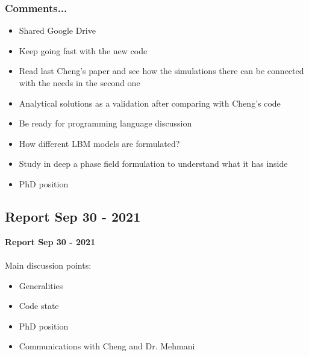 \documentclass{beamer}
\begin{document}
	\begin{frame}
		\frametitle{Comments...}
		\begin{itemize}
			\item Shared Google Drive
			\item Keep going fast with the new code
			\item Read last Cheng's paper and see how the simulations there can be connected with the needs in the second one
			\item Analytical solutions as a validation after comparing with Cheng's code
			\item Be ready for programming language discussion
			\item How different LBM models are formulated?
			\item Study in deep a phase field formulation to understand what it has inside
			\item PhD position
		\end{itemize}
		
	\end{frame}
	
	\subsection{Report Sep 30 - 2021}
	\justifying
		\begin{frame}
			\textbf{Report Sep 30 - 2021}\\~\\
			Main discussion points:
			\begin{itemize}
				\item Generalities
				\item Code state
				\item PhD position
				\item Communications with Cheng and Dr. Mehmani
			\end{itemize}
		\end{frame}
		
\end{document}
